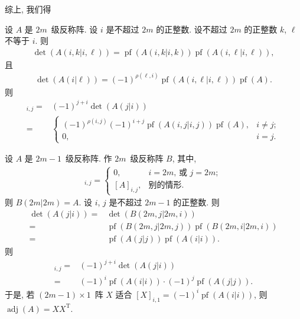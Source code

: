 \documentclass[../libro.tex]{subfiles}
\begin{document}
综上, 我们得

\begin{theorem}
    设 \(A\) 是 \(2m\)~级反称阵.
    设 \(i\) 是不超过 \(2m\) 的正整数.
    设不超过 \(2m\) 的正整数 \(k\), \(\ell\) 不等于 \(i\).
    则
    \begin{align*}
        \det {(A({i,k}|{i,\ell}))}
        = \operatorname{pf} {(A({i,k}|{i,k}))}
        \operatorname{pf} {(A({i,\ell}|{i,\ell}))},
    \end{align*}
    且
    \begin{align*}
        \det {(A(i|\ell))}
        = (-1)^{\rho(\ell, i)}
        \operatorname{pf} {(A({i,\ell}|{i,\ell}))}
        \operatorname{pf} {(A)}.
    \end{align*}
    则
    \begin{align*}
        [\operatorname{adj} {(A)}]_{i,j}
        = {} &
        (-1)^{j+i} \det {(A(j|i))}
        \\
        = {} &
        \begin{cases}
            (-1)^{\rho(i, j)}
            (-1)^{i+j}
            \operatorname{pf} {(A({i,j}|{i,j}))}
            \operatorname{pf} {(A)},
            & i \neq j; \\
            0,
            & i = j.
        \end{cases}
    \end{align*}
\end{theorem}

\begin{example}
    设 \(A\) 是 \(2m-1\)~级反称阵.
    作 \(2m\)~级反称阵 \(B\), 其中,
    \begin{align*}
        [B]_{i,j} =
        \begin{cases}
            0,         & \text{\(i = 2m\), 或 \(j = 2m\)}; \\
            [A]_{i,j}, & \text{别的情形}.
        \end{cases}
    \end{align*}
    则 \(B({2m}|{2m}) = A\).
    设 \(i\), \(j\) 是不超过 \(2m-1\) 的正整数.
    则
    \begin{align*}
        \det {(A(j|i))}
        = {} &
        \det {(B({2m,j}|{2m,i}))}
        \\
        = {} &
        \operatorname{pf} {(B({2m,j}|{2m,j}))}
        \operatorname{pf} {(B({2m,i}|{2m,i}))}
        \\
        = {} &
        \operatorname{pf} {(A(j|j))}
        \operatorname{pf} {(A(i|i))}.
    \end{align*}
    则
    \begin{align*}
        [\operatorname{adj} {(A)}]_{i,j}
        = {} &
        (-1)^{j+i} \det {(A(j|i))}
        \\
        = {} &
        (-1)^i \operatorname{pf} {(A(i|i))}
        \cdot
        (-1)^j \operatorname{pf} {(A(j|j))}.
    \end{align*}
    于是, 若 \((2m-1) \times 1\)~阵 \(X\) 适合
    \([X]_{i,1}
    = (-1)^i \operatorname{pf} {(A(i|i))}\),
    则 \(\operatorname{adj} {(A)} = X X^{\mathrm{T}}\).
\end{example}
\end{document}
